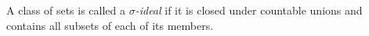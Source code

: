 A class of sets is called a \textit{$\sigma$-ideal} if it is closed under countable unions and contains all subsets of each of its members.
